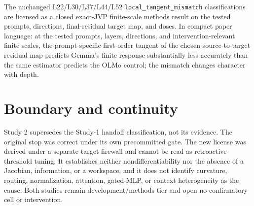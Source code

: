 \documentclass[11pt]{article}
\begin{document}
The unchanged L22/L30/L37/L44/L52
\texttt{local\_tangent\_mismatch} classifications are licensed as a closed
exact-JVP finite-scale methods result on the tested prompts, directions,
final-residual target map, and doses. In compact paper language: at the tested
prompts, layers, directions, and intervention-relevant finite scales, the
prompt-specific first-order tangent of the chosen source-to-target residual
map predicts Gemma's finite response substantially less accurately than the
same estimator predicts the OLMo control; the mismatch changes character with
depth.

\section{Boundary and continuity}
Study 2 supersedes the Study-1 handoff classification, not its evidence. The
original stop was correct under its own precommitted gate. The new license was
derived under a separate target firewall and cannot be read as retroactive
threshold tuning. It establishes neither nondifferentiability nor the absence
of a Jacobian, information, or a workspace, and it does not identify curvature,
routing, normalization, attention, gated-MLP, or context heterogeneity as the
cause. Both studies remain development/methods tier and open no confirmatory
cell or intervention.
\end{document}
